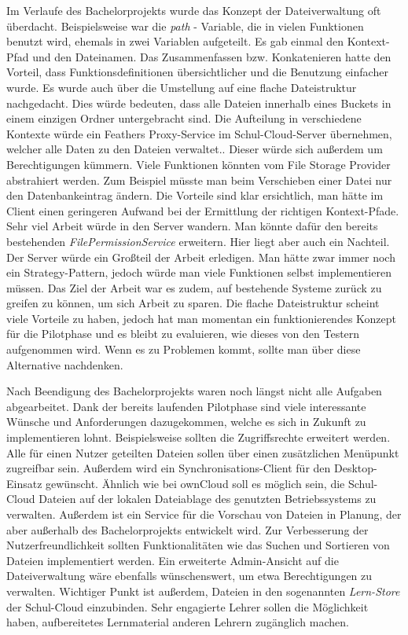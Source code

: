 Im Verlaufe des Bachelorprojekts wurde das Konzept der Dateiverwaltung oft überdacht. Beispielsweise war die \textit{path} - Variable, die in vielen Funktionen benutzt wird, ehemals in zwei Variablen aufgeteilt. Es gab einmal den Kontext-Pfad und den Dateinamen. Das Zusammenfassen bzw. Konkatenieren hatte den Vorteil, dass Funktionsdefinitionen übersichtlicher und die Benutzung einfacher wurde. Es wurde auch über die Umstellung auf eine flache Dateistruktur nachgedacht. Dies würde bedeuten, dass alle Dateien innerhalb eines Buckets in einem einzigen Ordner untergebracht sind. Die Aufteilung in verschiedene Kontexte würde ein Feathers Proxy-Service im Schul-Cloud-Server übernehmen, welcher alle Daten zu den Dateien verwaltet.. Dieser würde sich außerdem um Berechtigungen kümmern. Viele Funktionen könnten vom File Storage Provider abstrahiert werden. Zum Beispiel müsste man beim Verschieben einer Datei nur den Datenbankeintrag ändern. Die Vorteile sind klar ersichtlich, man hätte im Client einen geringeren Aufwand bei der Ermittlung der richtigen Kontext-Pfade. Sehr viel Arbeit würde in den Server wandern. Man könnte dafür den bereits bestehenden \textit{FilePermissionService} erweitern. Hier liegt aber auch ein Nachteil. Der Server würde ein Großteil der Arbeit erledigen. Man hätte zwar immer noch ein Strategy-Pattern, jedoch würde man viele Funktionen selbst implementieren müssen. Das Ziel der Arbeit war es zudem, auf bestehende Systeme zurück zu greifen zu können, um sich Arbeit zu sparen. Die flache Dateistruktur scheint viele Vorteile zu haben, jedoch hat man momentan ein funktionierendes Konzept für die Pilotphase und es bleibt zu evaluieren, wie dieses von den Testern aufgenommen wird. Wenn es zu Problemen kommt, sollte man über diese Alternative nachdenken.

Nach Beendigung des Bachelorprojekts waren noch längst nicht alle Aufgaben abgearbeitet. Dank der bereits laufenden Pilotphase sind viele interessante Wünsche und Anforderungen dazugekommen, welche es sich in Zukunft zu implementieren lohnt. Beispielsweise sollten die Zugriffsrechte erweitert werden. Alle für einen Nutzer geteilten Dateien sollen über einen zusätzlichen Menüpunkt zugreifbar sein. Außerdem wird ein Synchronisations-Client für den Desktop-Einsatz gewünscht. Ähnlich wie bei ownCloud soll es möglich sein, die Schul-Cloud Dateien auf der lokalen Dateiablage des genutzten Betriebssystems zu verwalten. Außerdem ist ein Service für die Vorschau von Dateien in Planung, der aber außerhalb des Bachelorprojekts entwickelt wird. Zur Verbesserung der Nutzerfreundlichkeit sollten Funktionalitäten wie das Suchen und Sortieren von Dateien implementiert werden. Ein erweiterte Admin-Ansicht auf die Dateiverwaltung wäre ebenfalls wünschenswert, um etwa Berechtigungen zu verwalten. Wichtiger Punkt ist außerdem, Dateien in den sogenannten \textit{Lern-Store} \cite{online:zehnforderungen} der Schul-Cloud einzubinden. Sehr engagierte Lehrer sollen die Möglichkeit haben, aufbereitetes Lernmaterial anderen Lehrern zugänglich machen. 

\clearpage
